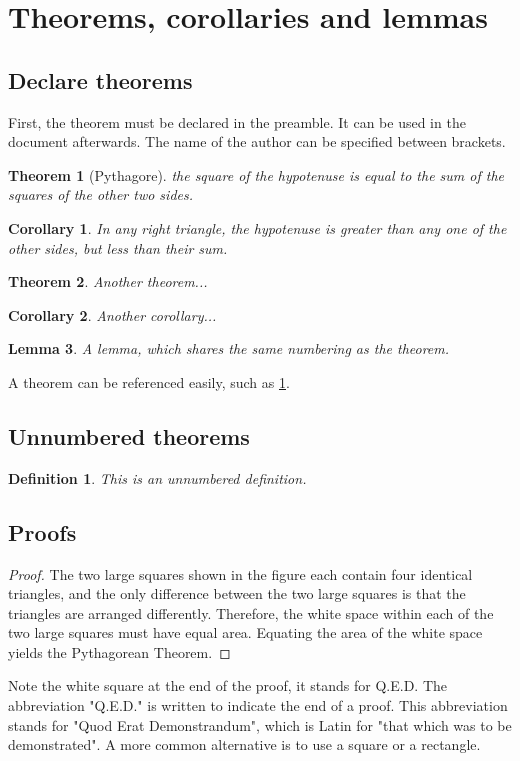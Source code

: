 \documentclass{article}
\newtheorem{theorem}{Theorem}[subsection]
\newtheorem{corollary}{Corollary}[theorem]
\newtheorem{lemma}[theorem]{Lemma}
\newtheorem*{definition}{Definition}
\begin{document}
\section{Theorems, corollaries and lemmas}

\subsection{Declare theorems}

First, the theorem must be declared in the preamble. It can be used in the document afterwards. The name of the author can be specified between brackets.

\begin{theorem}[Pythagore]
	\label{pythagore}
	the square of the hypotenuse is equal to the sum of the squares of the other two sides.
\end{theorem}

\begin{corollary}
	In any right triangle, the hypotenuse is greater than any one of the other sides, but less than their sum.
\end{corollary}

\begin{theorem}
	Another theorem...
\end{theorem}

\begin{corollary}
	Another corollary...
\end{corollary}

\begin{lemma}
	A lemma, which shares the same numbering as the theorem.
\end{lemma}

A theorem can be referenced easily, such as \ref{pythagore}.


\subsection{Unnumbered theorems}

\begin{definition}
	This is an unnumbered definition.
\end{definition}

\subsection{Proofs}

\begin{proof}
	The two large squares shown in the figure each contain four identical triangles, and the only difference between the two large squares is that the triangles are arranged differently. Therefore, the white space within each of the two large squares must have equal area. Equating the area of the white space yields the Pythagorean Theorem.
\end{proof}

Note the white square at the end of the proof, it stands for Q.E.D. The abbreviation "Q.E.D." is written to indicate the end of a proof. This abbreviation stands for "Quod Erat Demonstrandum", which is Latin for "that which was to be demonstrated". A more common alternative is to use a square or a rectangle.
\end{document}
